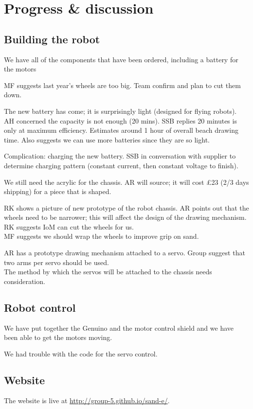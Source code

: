 \documentclass[a4paper,11pt,twoside,class=meetingmins,crop=false]{standalone}
\begin{document}
\section{Progress \& discussion}
\begin{items}
    \subsection{Building the robot}
        \item We have all of the components that have been ordered, including a battery for the motors
        \begin{subitems}
            \item MF suggests last year's wheels are too big. Team confirm and plan to cut them down.
            \item The new battery has come; it is surprisingly light (designed for flying robots).\\
            AH concerned the capacity is not enough (20 mins). SSB replies 20 minutes is only at maximum efficiency. Estimates around 1 hour of overall beach drawing time. Also suggests we can use more batteries since they are so light.
            \item Complication: charging the new battery. SSB in conversation with supplier to determine charging pattern (constant current, then constant voltage to finish).
            \item We still need the acrylic for the chassis. AR will source; it will cost \pounds{23} (2/3 days shipping) for a piece that is shaped.
            \item RK shows a picture of new prototype of the robot chassis. AR points out that the wheels need to be narrower; this will affect the design of the drawing mechanism. RK suggests IoM can cut the wheels for us.\\
            MF suggests we should wrap the wheels to improve grip on sand.
            \item AR has a prototype drawing mechanism attached to a servo. Group suggest that two arms per servo should be used.\\
            The method by which the servos will be attached to the chassis needs consideration.
        \end{subitems}
    \subsection{Robot control}
        \item We have put together the Genuino and the motor control shield and we have been able to get the motors moving.
        \item We had trouble with the code for the servo control.
    \subsection{Website}
        \item The website is live at \url{http://group-5.github.io/sand-e/}.
\end{items}
\end{document}
